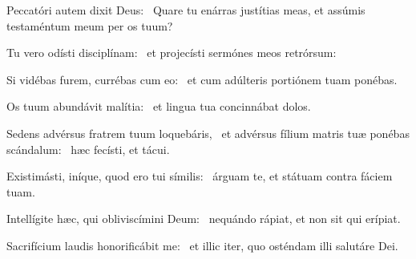 \item Peccatóri autem dixit Deus:~\psstar{} Quare tu enárras justítias meas, et assúmis testaméntum meum per os tuum?

\item Tu vero odísti disciplínam:~\psstar{} et projecísti sermónes meos retrórsum:

\item Si vidébas furem, currébas cum eo:~\psstar{} et cum adúlteris portiónem tuam ponébas.

\item Os tuum abundávit malítia:~\psstar{} et lingua tua concinnábat dolos.

\item Sedens advérsus fratrem tuum loquebáris,~\pscross{} et advérsus fílium matris tuæ ponébas scándalum:~\psstar{} hæc fecísti, et tácui.

\item Existimásti, iníque, quod ero tui símilis:~\psstar{} árguam te, et státuam contra fáciem tuam.

\item Intellígite hæc, qui obliviscímini Deum:~\psstar{} nequándo rápiat, et non sit qui erípiat.

\item Sacrifícium laudis honorificábit me:~\psstar{} et illic iter, quo osténdam illi salutáre Dei.